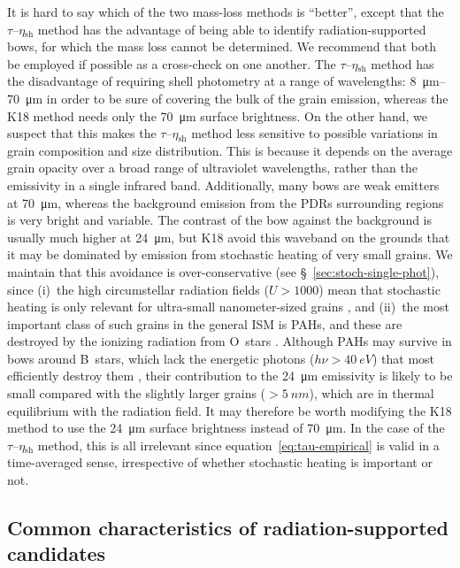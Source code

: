 \documentclass[useAMS, usenatbib, a4paper]{mnras}
\newcommand\shell{\ensuremath{_{\text{sh}}}}
\newcommand\hii{\ion{H}{ii}}
\begin{document}
It is hard to say which of the two mass-loss methods is ``better'',
except that the \(\tau\)--\(\eta\shell\) method has the advantage of
being able to identify radiation-supported bows, for which the mass
loss cannot be determined.  We recommend that both be employed if
possible as a cross-check on one another.  The
\(\tau\)--\(\eta\shell\) method has the disadvantage of requiring
shell photometry at a range of wavelengths: \SIrange{8}{70}{\um} in
order to be sure of covering the bulk of the grain emission, whereas
the K18 method needs only the \SI{70}{\um} surface brightness.  On the
other hand, we suspect that this makes the \(\tau\)--\(\eta\shell\)
method less sensitive to possible variations in grain composition and
size distribution.  This is because it depends on the average grain
opacity over a broad range of ultraviolet wavelengths, rather than the
emissivity in a single infrared band.  Additionally, many bows are
weak emitters at \SI{70}{\um}, whereas the background emission from
the PDRs surrounding \hii{} regions is very bright and variable.  The
contrast of the bow against the background is usually much higher at
\SI{24}{\um}, but K18 avoid this waveband on the grounds that it may
be dominated by emission from stochastic heating of very small grains.
We maintain that this avoidance is over-conservative (see
\S~\ref{sec:stoch-single-phot}), since (i)~the high circumstellar
radiation fields (\(U > 1000\)) mean that stochastic heating is only
relevant for ultra-small nanometer-sized grains \citep{Draine:2001a},
and (ii)~the most important class of such grains in the general ISM is
PAHs, and these are destroyed by the ionizing radiation from O~stars
\citep{Desert:1990a}.  Although PAHs may survive in bows around
B~stars, which lack the energetic photons (\(h\nu > \SI{40}{eV}\))
that most efficiently destroy them \citep{Lebouteiller:2007a}, their
contribution to the \SI{24}{\um} emissivity is likely to be small
compared with the slightly larger grains (\(> \SI{5}{nm}\)), which are
in thermal equilibrium with the radiation field.  It may therefore be
worth modifying the K18 method to use the \SI{24}{\um} surface
brightness instead of \SI{70}{\um}.  In the case of the
\(\tau\)--\(\eta\shell\) method, this is all irrelevant since
equation~\eqref{eq:tau-empirical} is valid in a time-averaged sense,
irrespective of whether stochastic heating is important or not.


\subsection{Common characteristics of radiation-supported candidates}
\label{sec:comm-prop-cand}
\end{document}
